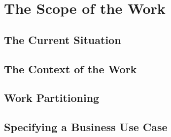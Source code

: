 \section{The Scope of the Work}
\subsection{The Current Situation}
\subsection{The Context of the Work}
\subsection{Work Partitioning}
\subsection{Specifying a Business Use Case}